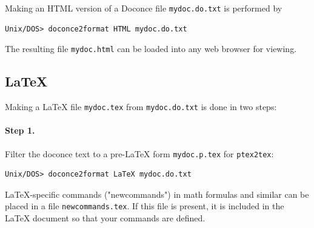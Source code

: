 \documentclass{article}
\begin{document}
Making an HTML version of a Doconce file {\fontsize{10pt}{10pt}\verb!mydoc.do.txt!}
is performed by
\begin{Verbatim}[fontsize=\fontsize{9pt}{9pt},tabsize=8,baselinestretch=0.85,
fontfamily=tt,xleftmargin=7mm]
Unix/DOS> doconce2format HTML mydoc.do.txt
\end{Verbatim}
\noindent
The resulting file {\fontsize{10pt}{10pt}\verb!mydoc.html!} can be loaded into any web browser for viewing.

\subsection{{\LaTeX}}

Making a {\LaTeX} file {\fontsize{10pt}{10pt}\verb!mydoc.tex!} from {\fontsize{10pt}{10pt}\verb!mydoc.do.txt!} is done in two steps:

\paragraph{Step 1.}
Filter the doconce text to a pre-{\LaTeX} form {\fontsize{10pt}{10pt}\verb!mydoc.p.tex!} for
     {\fontsize{10pt}{10pt}\verb!ptex2tex!}:
\begin{Verbatim}[fontsize=\fontsize{9pt}{9pt},tabsize=8,baselinestretch=0.85,
fontfamily=tt,xleftmargin=7mm]
Unix/DOS> doconce2format LaTeX mydoc.do.txt
\end{Verbatim}
\noindent
{\LaTeX}-specific commands ("newcommands") in math formulas and similar
can be placed in a file {\fontsize{10pt}{10pt}\verb!newcommands.tex!}. If this file is present,
it is included in the {\LaTeX} document so that your commands are
defined.
\end{document}
